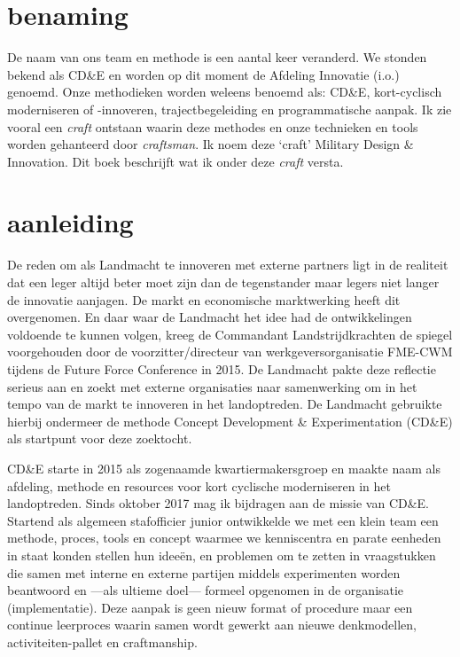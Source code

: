 \documentclass[
]{book}
\begin{document}
\hypertarget{benaming}{%
\section{benaming}\label{benaming}}

De naam van ons team en methode is een aantal keer veranderd. We stonden bekend als CD\&E en worden op dit moment de Afdeling Innovatie (i.o.) genoemd. Onze methodieken worden weleens benoemd als: CD\&E, kort-cyclisch moderniseren of -innoveren, trajectbegeleiding en programmatische aanpak. Ik zie vooral een \emph{craft} ontstaan waarin deze methodes en onze technieken en tools worden gehanteerd door \emph{craftsman}. Ik noem deze `craft' Military Design \& Innovation. Dit boek beschrijft wat ik onder deze \emph{craft} versta.

\hypertarget{aanleiding}{%
\section{aanleiding}\label{aanleiding}}

De reden om als Landmacht te innoveren met externe partners ligt in de realiteit dat een leger altijd beter moet zijn dan de tegenstander maar legers niet langer de innovatie aanjagen. De markt en economische marktwerking heeft dit overgenomen. En daar waar de Landmacht het idee had de ontwikkelingen voldoende te kunnen volgen, kreeg de Commandant Landstrijdkrachten de spiegel voorgehouden door de voorzitter/directeur van werkgeversorganisatie FME-CWM tijdens de Future Force Conference in 2015. De Landmacht pakte deze reflectie serieus aan en zoekt met externe organisaties naar samenwerking om in het tempo van de markt te innoveren in het landoptreden. De Landmacht gebruikte hierbij ondermeer de methode Concept Development \& Experimentation (CD\&E) als startpunt voor deze zoektocht.

CD\&E starte in 2015 als zogenaamde kwartiermakersgroep en maakte naam als afdeling, methode en resources voor kort cyclische moderniseren in het landoptreden. Sinds oktober 2017 mag ik bijdragen aan de missie van CD\&E. Startend als algemeen stafofficier junior ontwikkelde we met een klein team een methode, proces, tools en concept waarmee we kenniscentra en parate eenheden in staat konden stellen hun ideeën, en problemen om te zetten in vraagstukken die samen met interne en externe partijen middels experimenten worden beantwoord en ---als ultieme doel--- formeel opgenomen in de organisatie (implementatie). Deze aanpak is geen nieuw format of procedure maar een continue leerproces waarin samen wordt gewerkt aan nieuwe denkmodellen, activiteiten-pallet en craftmanship.
\end{document}
